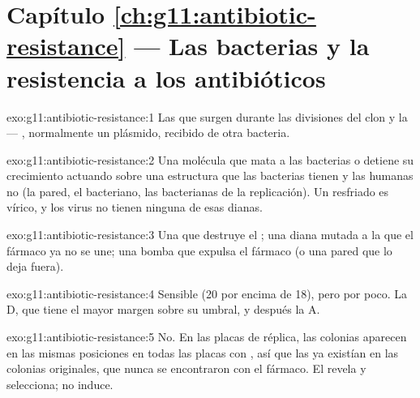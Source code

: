 \section*{Capítulo \ref{ch:g11:antibiotic-resistance} --- Las bacterias y la resistencia a los antibióticos}

\begin{solution}{exo:g11:antibiotic-resistance:1}
Las  que surgen durante las divisiones del clon y la
 --- , normalmente un plásmido,
recibido de otra bacteria.
\end{solution}

\begin{solution}{exo:g11:antibiotic-resistance:2}
Una molécula que mata a las bacterias o detiene su crecimiento
actuando sobre una estructura que las bacterias tienen y las 
humanas no (la pared, el  bacteriano, las  bacterianas
de la replicación). Un resfriado es vírico, y los virus no tienen
ninguna de esas dianas.
\end{solution}

\begin{solution}{exo:g11:antibiotic-resistance:3}
Una  que destruye el ; una diana mutada a la que el
fármaco ya no se une; una bomba que expulsa el fármaco (o una pared que
lo deja fuera).
\end{solution}

\begin{solution}{exo:g11:antibiotic-resistance:4}
Sensible (20 por encima de 18), pero por poco. La D, que tiene el mayor
margen sobre su umbral, y después la A.
\end{solution}

\begin{solution}{exo:g11:antibiotic-resistance:5}
No. En las placas de réplica, las colonias  aparecen en las
mismas posiciones en todas las placas con , así que las
  ya existían en las colonias originales, que nunca
se encontraron con el fármaco. El  revela y selecciona; no
induce.
\end{solution}

